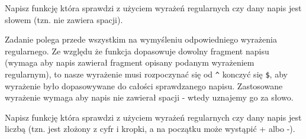 %
%

\dbEntryCheckResults
Napisz funkcję która sprawdzi z użyciem wyrażeń regularnych czy dany napis jest słowem (tzn. nie zawiera spacji).
\fi
{}\dbEntryCheckResults
{}

Zadanie polega przede wszystkim na wymyśleniu odpowiedniego wyrażenia regularnego.
Ze względu że funkcja  dopasowuje dowolny fragment napisu (wymaga aby napis zawierał fragment opisany podanym wyrażeniem regularnym),
	to nasze wyrażenie musi rozpoczynać się od \Verb#^# konczyć się \Verb#$#, aby wyrażenie było dopasowywane do całości sprawdzanego napisu.
Zastosowane wyrażenie wymaga aby napis nie zawierał spacji - wtedy uznajemy go za słowo.
\fi

\dbEntryCheckResults
Napisz funkcję która sprawdzi z użyciem wyrażeń regularnych czy dany napis jest liczbą (tzn. jest złożony z cyfr i kropki, a na początku może wystąpić + albo -).
\fi
{}\dbEntryCheckResults
{}
\fi
